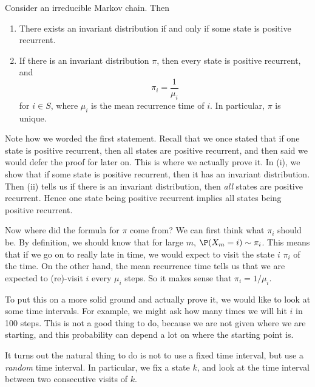 \documentclass[a4paper]{article}
\begin{document}
\begin{thm}
  Consider an irreducible Markov chain. Then
  \begin{enumerate}
    \item There exists an invariant distribution if and only if some state is positive recurrent.
    \item If there is an invariant distribution $\pi$, then every state is positive recurrent, and
      \[
        \pi_i = \frac{1}{\mu_i}
      \]
      for $i \in S$, where $\mu_i$ is the mean recurrence time of $i$. In particular, $\pi$ is unique.
  \end{enumerate}
\end{thm}
Note how we worded the first statement. Recall that we once stated that if one state is positive recurrent, then all states are positive recurrent, and then said we would defer the proof for later on. This is where we actually prove it. In (i), we show that if some state is positive recurrent, then it has an invariant distribution. Then (ii) tells us if there is an invariant distribution, then \emph{all} states are positive recurrent. Hence one state being positive recurrent implies all states being positive recurrent.

Now where did the formula for $\pi$ come from? We can first think what $\pi_i$ should be. By definition, we should know that for large $m$, $\P(X_m = i) \sim \pi_i$. This means that if we go on to really late in time, we would expect to visit the state $i$ $\pi_i$ of the time. On the other hand, the mean recurrence time tells us that we are expected to (re)-visit $i$ every $\mu_i$ steps. So it makes sense that $\pi_i = 1/\mu_i$.

To put this on a more solid ground and actually prove it, we would like to look at some time intervals. For example, we might ask how many times we will hit $i$ in 100 steps. This is not a good thing to do, because we are not given where we are starting, and this probability can depend a lot on where the starting point is.

It turns out the natural thing to do is not to use a fixed time interval, but use a \emph{random} time interval. In particular, we fix a state $k$, and look at the time interval between two consecutive visits of $k$.
\end{document}
